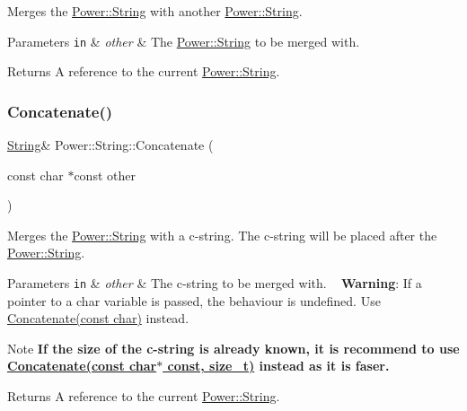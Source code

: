 Merges the \hyperlink{class_power_1_1_string}{Power\+::\+String} with another \hyperlink{class_power_1_1_string}{Power\+::\+String}. 


\begin{DoxyParams}[1]{Parameters}
\mbox{\tt in}  & {\em other} & The \hyperlink{class_power_1_1_string}{Power\+::\+String} to be merged with. \\
\hline
\end{DoxyParams}
\begin{DoxyReturn}{Returns}
A reference to the current \hyperlink{class_power_1_1_string}{Power\+::\+String}. 
\end{DoxyReturn}
\mbox{\label{class_power_1_1_string_a366471411eb6e5eed0cc6b4754d740fb}} 
\subsubsection{\texorpdfstring{Concatenate()}{Concatenate()}\hspace{0.1cm}{\footnotesize\ttfamily [2/4]}}
{\footnotesize\ttfamily \hyperlink{class_power_1_1_string}{String}\& Power\+::\+String\+::\+Concatenate (\begin{DoxyParamCaption}\item[{const char $\ast$const}]{other }\end{DoxyParamCaption})\hspace{0.3cm}{\ttfamily [inline]}}



Merges the \hyperlink{class_power_1_1_string}{Power\+::\+String} with a c-\/string. The c-\/string will be placed after the \hyperlink{class_power_1_1_string}{Power\+::\+String}. 


\begin{DoxyParams}[1]{Parameters}
\mbox{\tt in}  & {\em other} & The c-\/string to be merged with. ~\newline
 {\bfseries Warning}\+: If a pointer to a char variable is passed, the behaviour is undefined. Use \hyperlink{class_power_1_1_string_a27c784f6b30c2ca3504cb217a3f3107a}{Concatenate(const char)} instead. \\
\hline
\end{DoxyParams}
\begin{DoxyNote}{Note}
{\bfseries If the size of the c-\/string is already known, it is recommend to use \hyperlink{class_power_1_1_string_a180f61ef4e566993096eefaad01e56c1}{Concatenate(const char$\ast$ const, size\+\_\+t)} instead as it is faser.} 
\end{DoxyNote}
\begin{DoxyReturn}{Returns}
A reference to the current \hyperlink{class_power_1_1_string}{Power\+::\+String}. 
\end{DoxyReturn}
\mbox{\label{class_power_1_1_string_a180f61ef4e566993096eefaad01e56c1}} 
